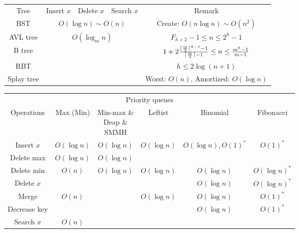 \begin{enumerate}
\begin{table}[H]
\begin{tabular}{|c|c|c|c|c|}
            \Xhline{3\arrayrulewidth}
            Tree & Insert $x$ & Delete $x$ & Search $x$ & Remark \\
            \Xhline{2\arrayrulewidth}
            BST & \multicolumn{3}{c|}{$O(\log n) \sim O(n)$} & Create: $O(n\log n) \sim O(n^2)$ \\
            \hline
            AVL tree & \multicolumn{3}{c|}{\multirow{4}{*}{$O(\log_m n)$}} & $F_{h + 2} - 1 \le n \le 2^h - 1$ \\
            \cline{1-1}\cline{5-5}
            B tree & \multicolumn{3}{c|}{} & $1 + 2\frac{\lceil\frac{m}{2}\rceil^{h - 1} - 1}{\lceil\frac{m}{2}\rceil - 1} \le n \le \frac{m^h - 1}{m - 1}$ \\
            \cline{1-1}\cline{5-5}
            RBT & \multicolumn{3}{c|}{} & $h \le 2\log (n + 1)$ \\
            \cline{1-1}\cline{5-5}
            Splay tree & \multicolumn{3}{c|}{} & Worst: $O(n)$, Amortized: $O(\log n)$ \\
            \hline
        \end{tabular}
    \end{table}
    \begin{table}[H]
        \centering
        \begin{tabular}{|c|c|c|c|c|c|}
            \hline
            \multicolumn{6}{|c|}{Priority queues} \\
            \Xhline{3\arrayrulewidth}
            Operations & Max (Min) & \makecell{Min-max \&\\Deap \&\\SMMH} & Leftist & Binomial & Fibonacci \\
            \Xhline{2\arrayrulewidth}
            Insert $x$ & $O(\log n)$ & $O(\log n)$ & $O(\log n)$ & $O(\log n), O(1)^*$ & $O(1)^*$ \\
            \hline
            Delete max & $O(\log n)$ & $O(\log n)$ & & & \\
            \hline
            Delete min & $O(n)$ & $O(\log n)$ & $O(\log n)$ & $O(\log n)$ & $O(\log n)^*$ \\
            \hline
            Delete $x$ & & & & $O(\log n)$ & $O(\log n)^*$ \\
            \hline
            Merge & $O(n)$ & & $O(\log n)$ & $O(\log n)$ & $O(1)^*$ \\
            \hline
            Decrease key & & & & $O(\log n)$ & $O(1)^*$ \\
            \hline
            Search $x$ & $O(n)$ & & & & \\

\end{tabular}
\end{table}
\end{enumerate}
